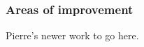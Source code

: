 \documentclass[twoside,10pt]{report}
\begin{document}
\subsubsection{Areas of improvement}\label{sec:topmodelImprovement}
Pierre's newer work to go here.




\end{document}
